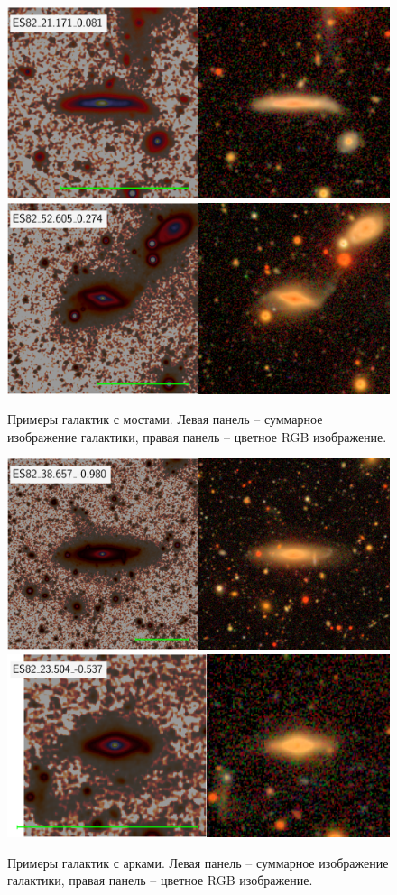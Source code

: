 \begin{figure}[ht]

    \includegraphics[width=.5\textwidth]{images/247.png}\hfill
    \includegraphics[width=.5\textwidth]{images/471.png}\hfill
    \caption{Примеры галактик с мостами. Левая панель -- суммарное изображение галактики, правая панель -- цветное RGB изображение.}\label{fig:bridges}
\end{figure}

\begin{figure}[ht]

    \includegraphics[width=.5\textwidth]{images/52.png}\hfill
    \includegraphics[width=.5\textwidth]{images/262.png}\hfill

    \caption{Примеры галактик с арками. Левая панель -- суммарное изображение галактики, правая панель -- цветное RGB изображение.}\label{fig:arcs}
\end{figure}

